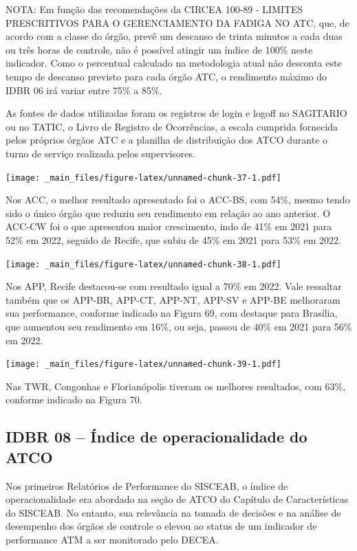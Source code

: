\documentclass[
]{book}
\begin{document}
NOTA: Em função das recomendações da CIRCEA 100-89 - LIMITES PRESCRITIVOS PARA O GERENCIAMENTO DA FADIGA NO ATC, que, de acordo com a classe do órgão, prevê um descanso de trinta minutos a cada duas ou três horas de controle, não é possível atingir um índice de 100\% neste indicador. Como o percentual calculado na metodologia atual não desconta este tempo de descanso previsto para cada órgão ATC, o rendimento máximo do IDBR 06 irá variar entre 75\% a 85\%.

As fontes de dados utilizadas foram os registros de login e logoff no SAGITARIO ou no TATIC, o Livro de Registro de Ocorrências, a escala cumprida fornecida pelos próprios órgãos ATC e a planilha de distribuição dos ATCO durante o turno de serviço realizada pelos supervisores.

\texttt{[image: \_main\_files/figure-latex/unnamed-chunk-37-1.pdf]}

Nos ACC, o melhor resultado apresentado foi o ACC-BS, com 54\%, mesmo tendo sido o único órgão que reduziu seu rendimento em relação ao ano anterior. O ACC-CW foi o que apresentou maior crescimento, indo de 41\% em 2021 para 52\% em 2022, seguido de Recife, que subiu de 45\% em 2021 para 53\% em 2022.

\texttt{[image: \_main\_files/figure-latex/unnamed-chunk-38-1.pdf]}

Nos APP, Recife destacou-se com resultado igual a 70\% em 2022. Vale ressaltar também que os APP-BR, APP-CT, APP-NT, APP-SV e APP-BE melhoraram sua performance, conforme indicado na Figura 69, com destaque para Brasília, que aumentou seu rendimento em 16\%, ou seja, passou de 40\% em 2021 para 56\% em 2022.

\texttt{[image: \_main\_files/figure-latex/unnamed-chunk-39-1.pdf]}

Nas TWR, Congonhas e Florianópolis tiveram os melhores resultados, com 63\%, conforme indicado na Figura 70.

\hypertarget{idbr-08-uxedndice-de-operacionalidade-do-atco}{%
\subsection{IDBR 08 -- Índice de operacionalidade do ATCO}\label{idbr-08-uxedndice-de-operacionalidade-do-atco}}

Nos primeiros Relatórios de Performance do SISCEAB, o índice de operacionalidade era abordado na seção de ATCO do Capítulo de Características do SISCEAB. No entanto, sua relevância na tomada de decisões e na análise de desempenho dos órgãos de controle o elevou ao status de um indicador de performance ATM a ser monitorado pelo DECEA.
\end{document}
